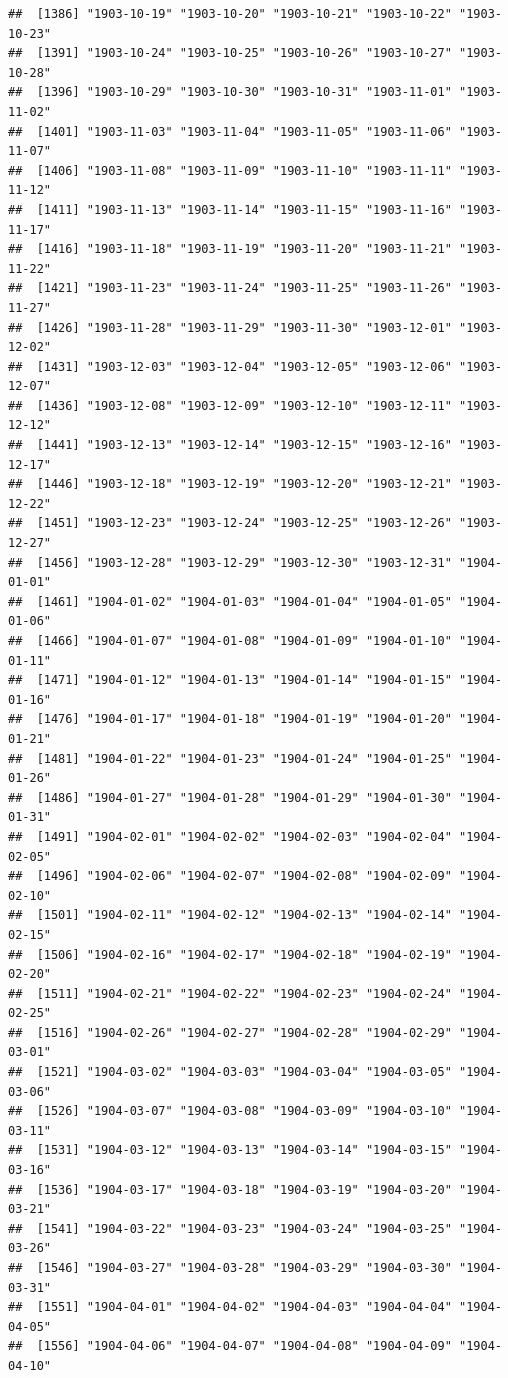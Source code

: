 \documentclass{article}\usepackage[]{graphicx}\usepackage[]{color}
\makeatletter
\newenvironment{kframe}{%
 \def\at@end@of@kframe{}%
 \ifinner\ifhmode%
  \def\at@end@of@kframe{\end{minipage}}%
  \begin{minipage}{\columnwidth}%
 \fi\fi%
 \def\FrameCommand##1{\hskip\@totalleftmargin \hskip-\fboxsep
 \colorbox{shadecolor}{##1}\hskip-\fboxsep
     \hskip-\linewidth \hskip-\@totalleftmargin \hskip\columnwidth}%
 \MakeFramed {\advance\hsize-\width
   \@totalleftmargin\z@ \linewidth\hsize
   \@setminipage}}%
 {\par\unskip\endMakeFramed%
 \at@end@of@kframe}
\newenvironment{knitrout}{}{} %
\makeatother
\begin{document}
\begin{description}
\begin{knitrout}
\begin{kframe}
\begin{verbatim}
##  [1386] "1903-10-19" "1903-10-20" "1903-10-21" "1903-10-22" "1903-10-23"
##  [1391] "1903-10-24" "1903-10-25" "1903-10-26" "1903-10-27" "1903-10-28"
##  [1396] "1903-10-29" "1903-10-30" "1903-10-31" "1903-11-01" "1903-11-02"
##  [1401] "1903-11-03" "1903-11-04" "1903-11-05" "1903-11-06" "1903-11-07"
##  [1406] "1903-11-08" "1903-11-09" "1903-11-10" "1903-11-11" "1903-11-12"
##  [1411] "1903-11-13" "1903-11-14" "1903-11-15" "1903-11-16" "1903-11-17"
##  [1416] "1903-11-18" "1903-11-19" "1903-11-20" "1903-11-21" "1903-11-22"
##  [1421] "1903-11-23" "1903-11-24" "1903-11-25" "1903-11-26" "1903-11-27"
##  [1426] "1903-11-28" "1903-11-29" "1903-11-30" "1903-12-01" "1903-12-02"
##  [1431] "1903-12-03" "1903-12-04" "1903-12-05" "1903-12-06" "1903-12-07"
##  [1436] "1903-12-08" "1903-12-09" "1903-12-10" "1903-12-11" "1903-12-12"
##  [1441] "1903-12-13" "1903-12-14" "1903-12-15" "1903-12-16" "1903-12-17"
##  [1446] "1903-12-18" "1903-12-19" "1903-12-20" "1903-12-21" "1903-12-22"
##  [1451] "1903-12-23" "1903-12-24" "1903-12-25" "1903-12-26" "1903-12-27"
##  [1456] "1903-12-28" "1903-12-29" "1903-12-30" "1903-12-31" "1904-01-01"
##  [1461] "1904-01-02" "1904-01-03" "1904-01-04" "1904-01-05" "1904-01-06"
##  [1466] "1904-01-07" "1904-01-08" "1904-01-09" "1904-01-10" "1904-01-11"
##  [1471] "1904-01-12" "1904-01-13" "1904-01-14" "1904-01-15" "1904-01-16"
##  [1476] "1904-01-17" "1904-01-18" "1904-01-19" "1904-01-20" "1904-01-21"
##  [1481] "1904-01-22" "1904-01-23" "1904-01-24" "1904-01-25" "1904-01-26"
##  [1486] "1904-01-27" "1904-01-28" "1904-01-29" "1904-01-30" "1904-01-31"
##  [1491] "1904-02-01" "1904-02-02" "1904-02-03" "1904-02-04" "1904-02-05"
##  [1496] "1904-02-06" "1904-02-07" "1904-02-08" "1904-02-09" "1904-02-10"
##  [1501] "1904-02-11" "1904-02-12" "1904-02-13" "1904-02-14" "1904-02-15"
##  [1506] "1904-02-16" "1904-02-17" "1904-02-18" "1904-02-19" "1904-02-20"
##  [1511] "1904-02-21" "1904-02-22" "1904-02-23" "1904-02-24" "1904-02-25"
##  [1516] "1904-02-26" "1904-02-27" "1904-02-28" "1904-02-29" "1904-03-01"
##  [1521] "1904-03-02" "1904-03-03" "1904-03-04" "1904-03-05" "1904-03-06"
##  [1526] "1904-03-07" "1904-03-08" "1904-03-09" "1904-03-10" "1904-03-11"
##  [1531] "1904-03-12" "1904-03-13" "1904-03-14" "1904-03-15" "1904-03-16"
##  [1536] "1904-03-17" "1904-03-18" "1904-03-19" "1904-03-20" "1904-03-21"
##  [1541] "1904-03-22" "1904-03-23" "1904-03-24" "1904-03-25" "1904-03-26"
##  [1546] "1904-03-27" "1904-03-28" "1904-03-29" "1904-03-30" "1904-03-31"
##  [1551] "1904-04-01" "1904-04-02" "1904-04-03" "1904-04-04" "1904-04-05"
##  [1556] "1904-04-06" "1904-04-07" "1904-04-08" "1904-04-09" "1904-04-10"

\end{verbatim}
\end{kframe}
\end{knitrout}
\end{description}
\end{document}

